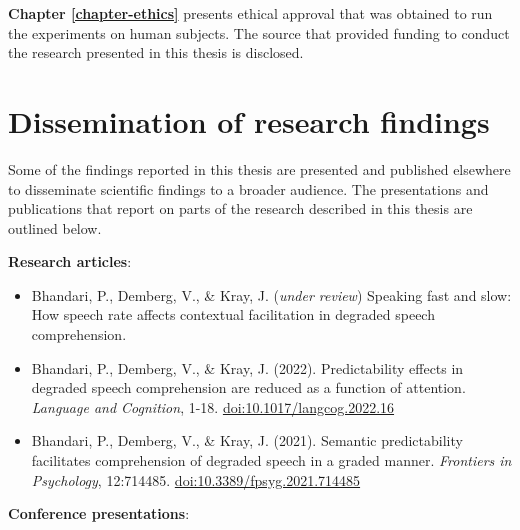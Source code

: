 \documentclass[a4paper, nobind]{templates/ociamthesis}
\begin{document}
\noindent
\textbf{Chapter \ref{chapter-ethics}} presents ethical approval that was obtained to run the experiments on human subjects.
The source that provided funding to conduct the research presented in this thesis is disclosed.

\hypertarget{dissemination-of-research-findings}{%
\section{Dissemination of research findings}\label{dissemination-of-research-findings}}

Some of the findings reported in this thesis are presented and published elsewhere to disseminate scientific findings to a broader audience.
The presentations and publications that report on parts of the research described in this thesis are outlined below.

\textbf{Research articles}:

\begin{itemize}
\item
  Bhandari, P., Demberg, V., \& Kray, J.
  (\emph{under review}) Speaking fast and slow: How speech rate affects contextual facilitation in degraded speech comprehension.
\item
  Bhandari, P., Demberg, V., \& Kray, J.
  (2022).
  Predictability effects in degraded speech comprehension are reduced as a function of attention.
  \emph{Language and Cognition}, 1-18. \url{doi:10.1017/langcog.2022.16}
\item
  Bhandari, P., Demberg, V., \& Kray, J.
  (2021).
  Semantic predictability facilitates comprehension of degraded speech in a graded manner.
  \emph{Frontiers in Psychology}, 12:714485. \url{doi:10.3389/fpsyg.2021.714485}
\end{itemize}

\textbf{Conference presentations}:
\end{document}
